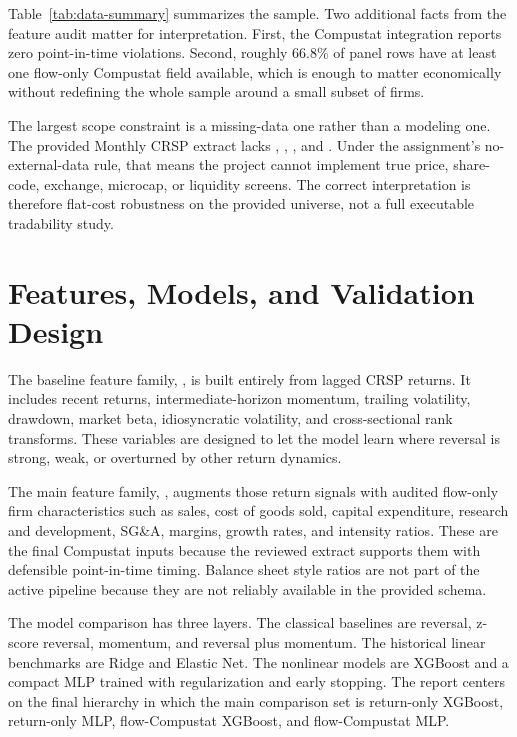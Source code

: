 Table~\ref{tab:data-summary} summarizes the sample. Two additional facts from
the feature audit matter for interpretation. First, the Compustat
integration reports zero point-in-time violations. Second, roughly 66.8\% of
panel rows have at least one flow-only Compustat field available, which is
enough to matter economically without redefining the whole sample around a
small subset of firms.

The largest scope constraint is a missing-data one rather than a modeling one.
The provided Monthly CRSP extract lacks , ,
, and . Under the assignment's no-external-data rule,
that means the project cannot implement true price, share-code, exchange,
microcap, or liquidity screens. The correct interpretation is therefore
flat-cost robustness on the provided universe, not a full executable
tradability study.

\section{Features, Models, and Validation Design}

The baseline feature family, , is built entirely from
lagged CRSP returns. It includes recent returns, intermediate-horizon
momentum, trailing volatility, drawdown, market beta, idiosyncratic
volatility, and cross-sectional rank transforms. These variables are designed
to let the model learn where reversal is strong, weak, or overturned by other
return dynamics.

The main feature family, , augments those return signals
with audited flow-only firm characteristics such as sales, cost of goods sold,
capital expenditure, research and development, SG\&A, margins, growth rates,
and intensity ratios. These are the final Compustat inputs because the
reviewed extract supports them with defensible point-in-time timing. Balance
sheet style ratios are not part of the active pipeline because they are not
reliably available in the provided schema.

The model comparison has three layers. The classical baselines are reversal,
z-score reversal, momentum, and reversal plus momentum. The historical linear
benchmarks are Ridge and Elastic Net. The nonlinear models are XGBoost and a
compact MLP trained with regularization and early stopping. The report centers
on the final hierarchy in which the main comparison set is
return-only XGBoost, return-only MLP, flow-Compustat XGBoost, and
flow-Compustat MLP.

